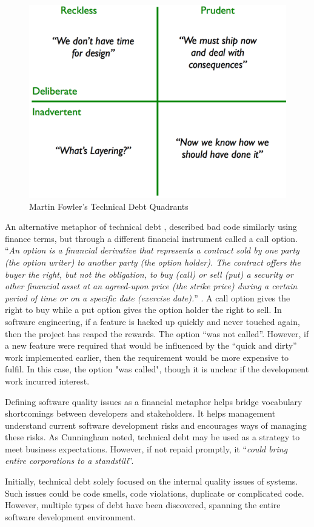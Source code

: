 \documentclass{mprop}
\begin{document}
\begin{figure}
	\centering
	\includegraphics[width=0.5\linewidth]{visualisations/TD_quadrants.png}
	\caption{Martin Fowler's Technical Debt Quadrants}
	\label{fig:td-quandrants}
\end{figure}


An alternative metaphor of technical debt \cite{UnhedgedCallOption}, described
bad code similarly using finance terms, but through a different financial
instrument called a call option. ``\textit{An option is a financial derivative
	that represents a contract sold by one party (the option writer) to another
	party (the option holder). The contract offers the buyer the right, but not the
	obligation, to buy (call) or sell (put) a security or other financial asset at
	an agreed-upon price (the strike price) during a certain period of time or on a
	specific date (exercise date).}'' \cite{option-investopedia}. A call option
gives the right to buy while a put option gives the option holder the right to
sell. In software engineering, if a feature is hacked up quickly and never
touched again, then the project has reaped the rewards. The option ``was not
called''. However, if a new feature were required that would be influenced by
the ``quick and dirty'' work implemented earlier, then the requirement would be
more expensive to fulfil. In this case, the option "was called", though it is
unclear if the development work incurred interest.


Defining software quality issues as a financial metaphor helps bridge vocabulary
shortcomings between developers and stakeholders. It helps management understand
current software development risks and encourages ways of managing these risks.
As Cunningham \cite{Cunningham1993} noted, technical debt may be used as a
strategy to meet business expectations. However, if not repaid promptly, it
``\textit{could bring entire corporations to a standstill}''.

Initially, technical debt solely focused on the internal quality issues of
systems. Such issues could be code smells, code violations, duplicate or
complicated code. However, multiple types of debt have been discovered, spanning
the entire software development environment.
\end{document}
